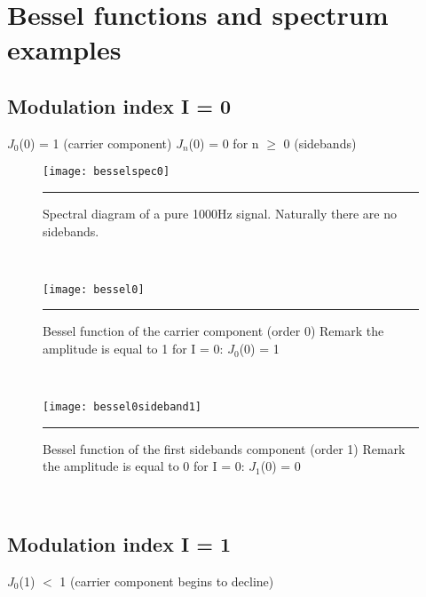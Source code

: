 
\chapter{Bessel functions and spectrum examples} %

\label{AppendixA} %


\section{Modulation index I = 0}
\hspace{1cm} $J_{0}$(0) = 1 (carrier component) \hspace{1cm} $J_{n}$(0) = 0 for n $\geq$ 0  (sidebands) \\ 
\begin{figure}[htbp]
\centering
\texttt{[image: besselspec0]}
\rule{30em}{0.5pt}
\caption[Spectrum of a 1000Hz signal]{Spectral diagram of a pure 1000Hz signal. Naturally there are no sidebands.}
\label{fig:besselspec0}
\end{figure}\\
\begin{figure}[htbp]
\centering
\texttt{[image: bessel0]}
\rule{30em}{0.5pt}
\caption[Bessel function of order 0]{Bessel function of the carrier component (order 0) Remark the amplitude is equal to 1 for I = 0: $J_{0}$(0) = 1}
\label{fig:bessel0}
\end{figure}\\
\begin{figure}[htbp]
\centering
\texttt{[image: bessel0sideband1]}
\rule{30em}{0.5pt}
\caption[Bessel function of order 1]{Bessel function of the first sidebands component (order 1) Remark the amplitude is equal to 0 for I = 0: $J_{1}$(0) = 0}
\label{fig:bessel0}
\end{figure}\\
\section{Modulation index I = 1}
\hspace{1cm} $J_{0}$(1) $<$ 1 (carrier component begins to decline) \\ 

